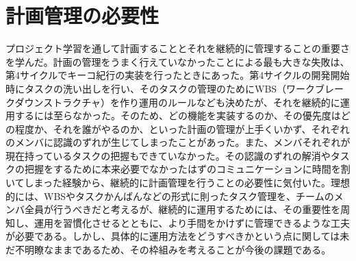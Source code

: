\section{計画管理の必要性}
プロジェクト学習を通して計画することとそれを継続的に管理することの重要さを学んだ。計画の管理をうまく行えていなかったことによる最も大きな失敗は、第4サイクルでキーコ紀行の実装を行ったときにあった。第4サイクルの開発開始時にタスクの洗い出しを行い、そのタスクの管理のためにWBS（ワークブレークダウンストラクチャ）を作り運用のルールなども決めたが、それを継続的に運用するには至らなかった。そのため、どの機能を実装するのか、その優先度はどの程度か、それを誰がやるのか、といった計画の管理が上手くいかず、それぞれのメンバに認識のずれが生じてしまったことがあった。また、メンバそれぞれが現在持っているタスクの把握もできていなかった。その認識のずれの解消やタスクの把握をするために本来必要でなかったはずのコミュニケーションに時間を割いてしまった経験から、継続的に計画管理を行うことの必要性に気付いた。理想的には、WBSやタスクかんばんなどの形式に則ったタスク管理を、チームのメンバ全員が行うべきだと考えるが、継続的に運用するためには、その重要性を周知し、運用を習慣化させるとともに、より手間をかけずに管理できるような工夫が必要である。しかし、具体的に運用方法をどうすべきかという点に関しては未だ不明瞭なままであるため、その枠組みを考えることが今後の課題である。
